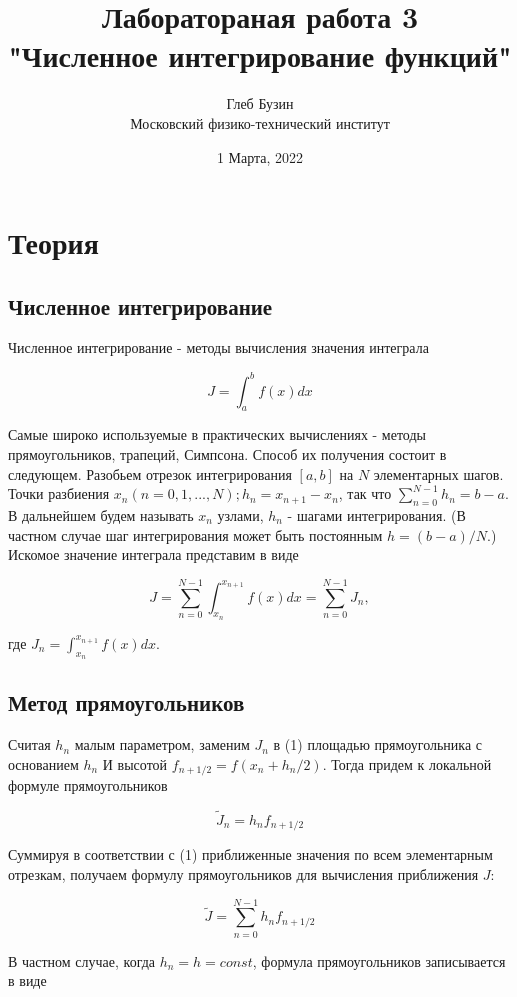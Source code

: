 \documentclass[a4paper,11pt]{article}
\title{
    Лаборатораная работа 3 \\
    "Численное интегрирование функций"
}
\date{1 Марта, 2022}
\author{
    Глеб Бузин \\
    Московский физико-технический институт
}
\begin{document}
\maketitle
\newpage
\tableofcontents
\newpage


\section{Теория}

\subsection{Численное интегрирование}

Численное интегрирование - методы вычисления значения интеграла

$$
J=\int ^{b}_{a}f\left( x\right) dx
$$

Самые широко используемые в практических вычислениях - методы прямоугольников, трапеций, Симпсона.
Способ их получения состоит в следующем. Разобьем отрезок интегрирования $[a, b]$ на $N$ элементарных шагов. Точки разбиения $x_n(n = 0,1,...,N); h_n = x_{n+1} - x_n$, так что
$\sum_{n = 0}^{N - 1}h_n = b - a $.
В дальнейшем будем называть $ x_n $ узлами, $h_n$ - шагами интегрирования.
(В частном случае шаг интегрирования может быть постоянным $h = (b - a)/N$.) Искомое значение интеграла представим в виде

\begin{equation}
J=\sum ^{N-1}_{n=0}\int ^{x_{n+1}}_{x_{n}}f\left( x\right) dx= \sum ^{N-1}_{n=0}J_{n},
\end{equation}

где $ J_n = \int ^{x_{n+1}}_{x_{n}}f\left( x\right) dx$.

\subsection{Метод прямоугольников}

Считая $h_n$ малым параметром, заменим $J_n$ в (1) площадью прямоугольника с основанием $h_n$ И высотой $f_{n+1/2} = f(x_n + h_n/2)$. Тогда придем к локальной формуле прямоугольников

$$
\tilde{J}_{n}=h_n f_{n+1/2}
$$

Суммируя в соответствии с (1) приближенные значения по всем элементарным отрезкам, получаем формулу прямоугольников для вычисления приближения $J$:

$$
\tilde{J} = \sum_{n=0}^{N-1} h_n f_{n+1/2}
$$

В частном случае, когда $h_n = h = const$, формула прямоугольников
записывается в виде
\end{document}
